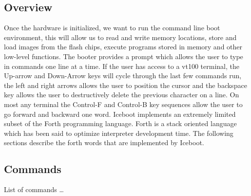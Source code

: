 \documentclass{article}
\begin{document}
	\subsection{Overview}

Once the hardware is initialized, we want to run
the command line boot environment, this will allow us 
to read and write memory locations, store and load
images from the flash chips, execute programs stored
in memory and other low-level functions.  The booter
provides a prompt which allows the user to 
type in commands one line at a time.  If the user
has access to a vt100 terminal, the Up-arrow and
Down-Arrow keys will cycle through the last few
commands run, the left and right arrows allows
the user to position the cursor and the backspace
key allows the user to destructively delete the
previous character on a line.  On most any terminal 
the Control-F and Control-B key sequences allow 
the user to go forward and backward one word.
Iceboot implements an extremely limited subset
of the Forth programming language.  Forth is a
stack oriented language which has been said to
optimize interpreter development time.  The following
sections describe the forth words that are implemented
by Iceboot.

	\subsection{Commands}	

List of commands \ldots
\end{document}
